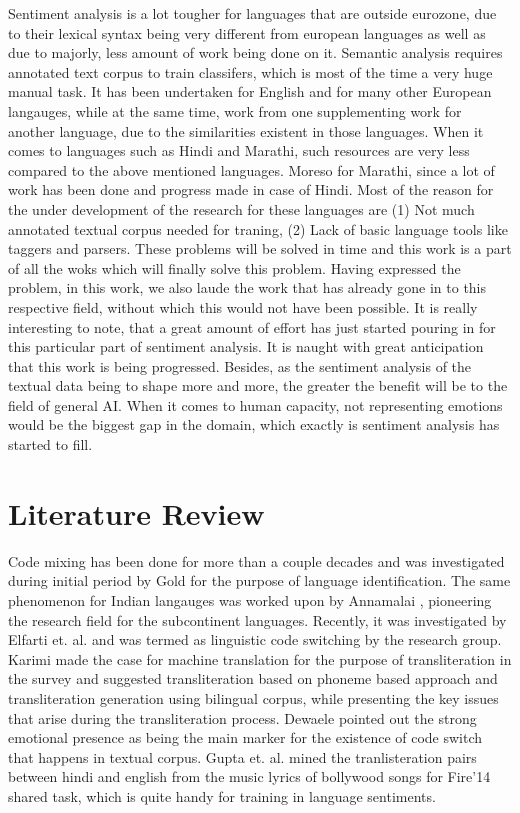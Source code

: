 \documentclass[12pt]{article}
\begin{document}
\fontsize{12}{20}\selectfont Sentiment analysis is a lot tougher for languages that are outside eurozone,
due to their lexical syntax being very different from european languages as
well as due to majorly, less amount of work being done on it. Semantic analysis
requires annotated text corpus to train classifers, which is most of the time a
very huge manual task. It has been undertaken for English and for many other
European langauges, while at the same time, work from one supplementing work
for another language, due to the similarities existent in those languages. When
it comes to languages such as Hindi and Marathi, such resources are very less
compared to the above mentioned languages. Moreso for Marathi, since a lot of
work has been done and progress made in case of Hindi. Most of the reason for
the under development of the research for these languages are (1) Not much
annotated textual corpus needed for traning, (2) Lack of basic language tools
like taggers and parsers. These problems will be solved in time and this work
is a part of all the woks which will finally solve this problem. 
Having expressed the problem, in this work, we also laude the work that has
already gone in to this respective field, without which this would not have
been possible. It is really interesting to note, that a great amount of effort
has just started pouring in for this particular part of sentiment analysis. It
is naught with great anticipation that this work is being progressed. Besides,
as the sentiment analysis of the textual data being to shape more and more, the
greater the benefit will be to the field of general AI. When it comes to human
capacity, not representing emotions would be the biggest gap in the domain,
which exactly is sentiment analysis has started to fill. \\


\section{Literature Review}

\fontsize{12}{20}\selectfont Code mixing has been done for more than a couple decades and was investigated
during initial period by Gold \cite{gold_language_1967} for the purpose of
language identification. The same phenomenon for Indian langauges was worked
upon by Annamalai \cite{annamalai_anglicized_1978}, pioneering the research
field for the subcontinent languages. Recently, it was investigated by Elfarti
et. al. \cite{elfardy_token_2012} and was termed as linguistic code switching
by the research group. Karimi \cite{karimi_machine_2011} made the case for
machine translation for the purpose of transliteration in the survey and
suggested transliteration based on phoneme based approach and transliteration
generation using bilingual corpus, while presenting the key issues that arise
during the transliteration process. Dewaele \cite{dewaele_emotions_2010}
pointed out the strong emotional presence as being the main marker for the
existence of code switch that happens in textual corpus. Gupta et. al.
\cite{gupta_mining_2012} mined the tranlisteration pairs between hindi and
english from the music lyrics of bollywood songs for Fire'14 shared task, which
is quite handy for training in language sentiments. 
\end{document}
